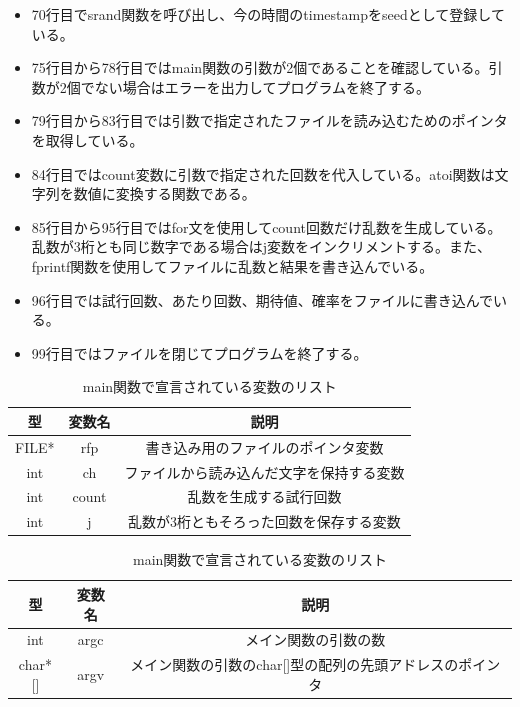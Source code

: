 \documentclass[dvipdfmx]{jsarticle}
\begin{document}
\begin{itemize}
  \item 70行目でsrand関数を呼び出し、今の時間のtimestampをseedとして登録している。
  \item 75行目から78行目ではmain関数の引数が2個であることを確認している。引数が2個でない場合はエラーを出力してプログラムを終了する。
  \item 79行目から83行目では引数で指定されたファイルを読み込むためのポインタを取得している。
  \item 84行目ではcount変数に引数で指定された回数を代入している。atoi関数は文字列を数値に変換する関数である。
  \item 85行目から95行目ではfor文を使用してcount回数だけ乱数を生成している。乱数が3桁とも同じ数字である場合はj変数をインクリメントする。また、fprintf関数を使用してファイルに乱数と結果を書き込んでいる。
  \item 96行目では試行回数、あたり回数、期待値、確率をファイルに書き込んでいる。
  \item 99行目ではファイルを閉じてプログラムを終了する。
\end{itemize}


\begin{table}[ht]
  \centering
  \begin{tabular}{|c|c|c|}
    \hline
    型     & 変数名 & 説明                         \\
    \hline
    FILE* & rfp & 書き込み用のファイルのポインタ変数          \\
    int   & ch  & ファイルから読み込んだ文字を保持する変数 \\
    int   & count &  乱数を生成する試行回数\\
    int   & j & 乱数が3桁ともそろった回数を保存する変数\\
    \hline
  \end{tabular}
  \caption{main関数で宣言されている変数のリスト}
  \label{table:variables2}
\end{table}

\begin{table}[ht]
  \centering
  \begin{tabular}{|c|c|c|}
    \hline
    型       & 変数名  & 説明                              \\
    \hline
    int     & argc & メイン関数の引数の数                      \\
    char*[] & argv & メイン関数の引数のchar[]型の配列の先頭アドレスのポインタ \\
    \hline
  \end{tabular}
  \caption{main関数で宣言されている変数のリスト}
  \label{table:arguments2}
\end{table}
\end{document}
